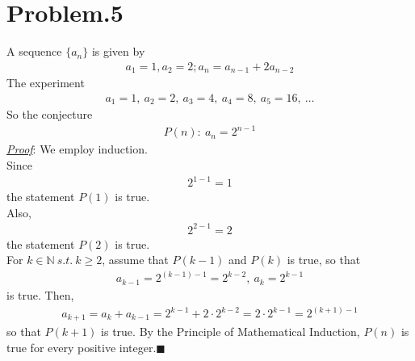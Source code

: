\documentclass[12pt]{article}
\begin{document}
\section*{Problem.5}
A sequence $\{ a_n \} $ is given by
\begin{gather*}
a_1 = 1, a_2 = 2; a_n = a_{n-1} + 2 a_{n-2}
\end{gather*}
The experiment
\begin{gather*}
a_1 = 1,~ a_2 = 2, ~a_3 = 4,~ a_4 = 8,~ a_5 = 16,~\dots
\end{gather*}
So the conjecture
\begin{gather*}
P(n):~a_n = 2^{n-1}
\end{gather*}
\underline{\textit{Proof}}: We employ induction.\\[1em]
Since
\begin{gather*}
2 ^{1-1} = 1
\end{gather*}
the statement $P(1)$ is true.\\
Also,
\begin{gather*}
2 ^{2-1} = 2
\end{gather*}
the statement $P(2)$ is true.\\
For $k \in \mathbb{N} ~s.t.~ k \geq 2$, assume that $P(k-1)$ and $P(k)$ is true, so that
\begin{gather*}
a_{k-1} = 2^{(k-1)-1} = 2^{k-2},~ a_k = 2^{k-1}
\end{gather*}
is true. Then,
\begin{gather*}
a_{k+1} = a_{k} + a_{k-1} = 2^{k-1} + 2 \cdot 2^{k-2} = 2 \cdot 2^{k-1} = 2^{(k+1)-1}
\end{gather*}
so that $P(k+1)$ is true. By the Principle of Mathematical Induction, $P(n)$ is true for every positive integer.$\blacksquare$
\end{document}
